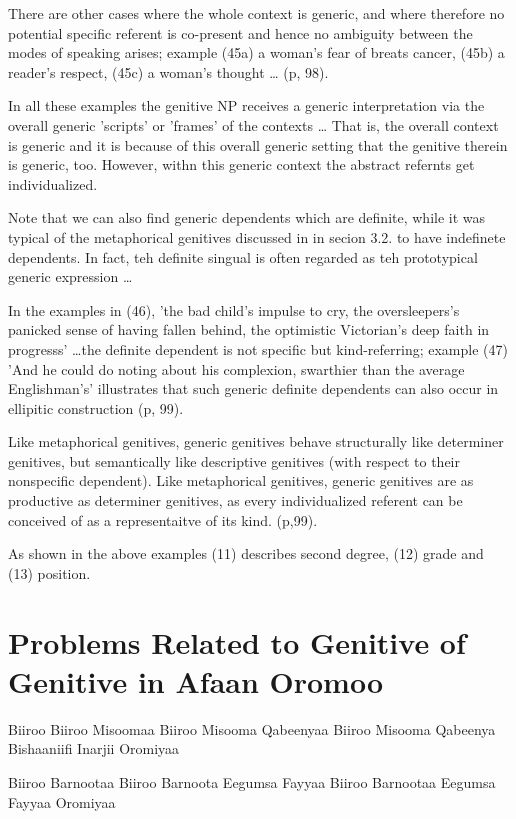 \documentclass[11pt,a4paper]{article}
\begin{document}
	There are other cases where the whole context is generic, and where therefore no potential specific referent is co-present
	and hence no ambiguity between the modes of speaking arises; example (45a) a woman's fear of breats cancer, (45b)
	a reader's respect, (45c) a woman's thought \ldots{} (p, 98).
	
	In all these examples the genitive NP receives a generic interpretation via the overall generic 'scripts' or 'frames'
	of the contexts \ldots{} That is, the overall context is generic and it is because of this overall generic setting that 
	the genitive therein is generic, too. However, withn this generic context the abstract refernts get individualized. 
	
	Note that we can also find generic dependents which are definite, while it was typical of the metaphorical genitives
	discussed in in secion 3.2. to have indefinete dependents. In fact, teh definite singual is often regarded as teh 
	prototypical generic expression \ldots{}
	
	In the examples in (46), 'the bad child's impulse to cry, the oversleepers's panicked sense of having fallen behind, 
	the optimistic Victorian's deep faith in progresss' \ldots{}the definite dependent is not specific but kind-referring;
	example (47) 'And he could do noting about his complexion, swarthier than the average Englishman's' illustrates that
	such generic definite dependents can also occur in ellipitic construction (p, 99). 
	
	Like metaphorical genitives, generic genitives behave structurally like determiner genitives, but semantically like
	descriptive genitives (with respect to their nonspecific dependent). Like metaphorical genitives, generic genitives are
	as productive as determiner genitives, as every individualized referent can be conceived of as a representaitve of its kind.
	(p,99). 
	
	
	As shown in the above examples (11) describes second degree, (12)  grade and (13) position. 
	
	\section{Problems Related to Genitive of Genitive in Afaan Oromoo}
	Biiroo
	Biiroo Misoomaa
	Biiroo Misooma Qabeenyaa
	Biiroo Misooma Qabeenya Bishaaniifi Inarjii Oromiyaa
	
	Biiroo Barnootaa
	Biiroo Barnoota Eegumsa Fayyaa
	Biiroo Barnootaa Eegumsa Fayyaa Oromiyaa
	
\end{document}
